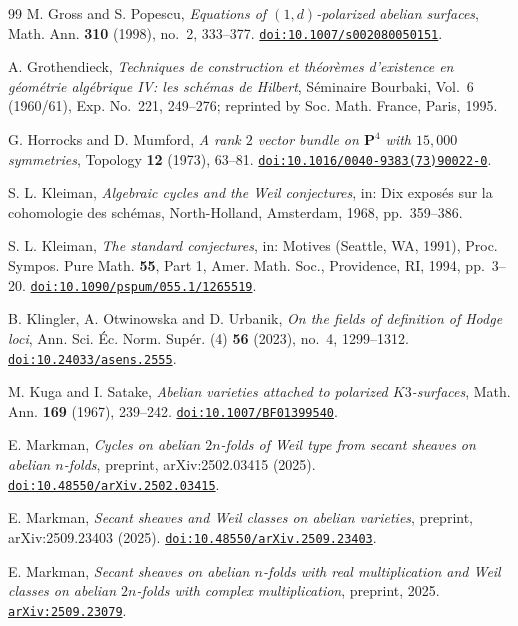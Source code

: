 \begin{thebibliography}{99}
M. Gross and S. Popescu,
\emph{Equations of $(1,d)$-polarized abelian surfaces},
Math. Ann. \textbf{310} (1998), no.~2, 333--377.
\href{https://doi.org/10.1007/s002080050151}{\texttt{doi:10.1007/s002080050151}}.

A. Grothendieck,
\emph{Techniques de construction et th\'eor\`emes d'existence en g\'eom\'etrie
alg\'ebrique IV: les sch\'emas de Hilbert},
S\'eminaire Bourbaki, Vol.~6 (1960/61), Exp. No.~221, 249--276;
reprinted by Soc. Math. France, Paris, 1995.

G. Horrocks and D. Mumford,
\emph{A rank $2$ vector bundle on $\mathbf{P}^{4}$ with $15{,}000$ symmetries},
Topology \textbf{12} (1973), 63--81.
\href{https://doi.org/10.1016/0040-9383(73)90022-0}{\texttt{doi:10.1016/0040-9383(73)90022-0}}.

S. L. Kleiman,
\emph{Algebraic cycles and the Weil conjectures},
in: Dix expos\'es sur la cohomologie des sch\'emas,
North-Holland, Amsterdam, 1968, pp.~359--386.

S. L. Kleiman,
\emph{The standard conjectures},
in: Motives (Seattle, WA, 1991),
Proc. Sympos. Pure Math. \textbf{55}, Part 1,
Amer. Math. Soc., Providence, RI, 1994, pp.~3--20.
\href{https://doi.org/10.1090/pspum/055.1/1265519}{\texttt{doi:10.1090/pspum/055.1/1265519}}.

B. Klingler, A. Otwinowska and D. Urbanik,
\emph{On the fields of definition of Hodge loci},
Ann. Sci. \'Ec. Norm. Sup\'er. (4) \textbf{56} (2023), no.~4, 1299--1312.
\href{https://doi.org/10.24033/asens.2555}{\texttt{doi:10.24033/asens.2555}}.

M. Kuga and I. Satake,
\emph{Abelian varieties attached to polarized $K3$-surfaces},
Math. Ann. \textbf{169} (1967), 239--242.
\href{https://doi.org/10.1007/BF01399540}{\texttt{doi:10.1007/BF01399540}}.

E. Markman,
\emph{Cycles on abelian $2n$-folds of Weil type from secant sheaves on abelian
$n$-folds}, preprint, arXiv:2502.03415 (2025).
\href{https://doi.org/10.48550/arXiv.2502.03415}{\texttt{doi:10.48550/arXiv.2502.03415}}.

E. Markman,
\emph{Secant sheaves and Weil classes on abelian varieties},
preprint, arXiv:2509.23403 (2025).
\href{https://doi.org/10.48550/arXiv.2509.23403}{\texttt{doi:10.48550/arXiv.2509.23403}}.

E. Markman,
\emph{Secant sheaves on abelian $n$-folds with real multiplication and Weil
classes on abelian $2n$-folds with complex multiplication},
preprint, 2025.
\href{https://arxiv.org/abs/2509.23079}{\texttt{arXiv:2509.23079}}.


\end{thebibliography}
